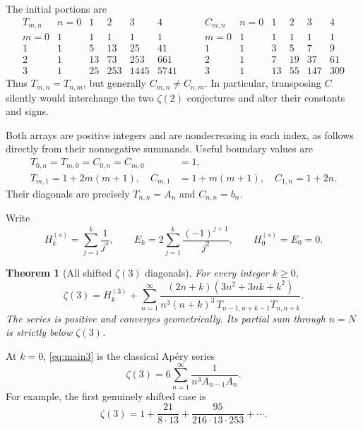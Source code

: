 \documentclass[11pt,letterpaper]{article}
\numberwithin{equation}{section}
\newtheorem{theorem}{Theorem}[section]
\theoremstyle{definition}
\newcommand{\Hh}[2]{H_{#1}^{(#2)}}
\newcommand{\zthree}{\zeta(3)}
\begin{document}
The initial portions are
\[
\begin{array}{c|rrrrr}
T_{m,n}&n=0&1&2&3&4\\\hline
m=0&1&1&1&1&1\\
1&1&5&13&25&41\\
2&1&13&73&253&661\\
3&1&25&253&1445&5741
\end{array}
\qquad
\begin{array}{c|rrrrr}
C_{m,n}&n=0&1&2&3&4\\\hline
m=0&1&1&1&1&1\\
1&1&3&5&7&9\\
2&1&7&19&37&61\\
3&1&13&55&147&309
\end{array}
\]
Thus $T_{m,n}=T_{n,m}$, but generally $C_{m,n}\ne C_{n,m}$.
In particular, transposing $C$ silently would interchange the two
$\zeta(2)$ conjectures and alter their constants and signs.

Both arrays are positive integers and are nondecreasing in each index,
as follows directly from their nonnegative summands. Useful boundary
values are
\begin{align}
 T_{0,n}=T_{m,0}=C_{0,n}=C_{m,0}&=1,\label{eq:boundary}\\
 T_{m,1}=1+2m(m+1),\quad
 C_{m,1}&=1+m(m+1),\quad C_{1,n}=1+2n.\label{eq:firstrow}
\end{align}
Their diagonals are precisely $T_{n,n}=A_n$ and $C_{n,n}=b_n$.

Write
\[
 \Hh{k}{s}=\sum_{j=1}^{k}\frac1{j^s},\qquad
 E_k=2\sum_{j=1}^{k}\frac{(-1)^{j+1}}{j^2},
 \qquad \Hh{0}{s}=E_0=0.
\]

\begin{theorem}[All shifted $\zeta(3)$ diagonals]\label{thm:zeta3}
For every integer $k\geq0$,
\begin{equation}\label{eq:main3}
 \boxed{\displaystyle
 \zthree=\Hh{k}{3}+
 \sum_{n=1}^{\infty}
 \frac{(2n+k)(3n^2+3nk+k^2)}
 {n^3(n+k)^3\,T_{n-1,n+k-1}T_{n,n+k}}.}
\end{equation}
The series is positive and converges geometrically. Its partial sum
through $n=N$ is strictly below $\zthree$.
\end{theorem}

At $k=0$, \eqref{eq:main3} is the classical Ap\'ery series
\begin{equation}\label{eq:classical3}
 \zthree=6\sum_{n=1}^{\infty}\frac1{n^3 A_{n-1}A_n}.
\end{equation}
For example, the first genuinely shifted case is
\[
 \zthree=1+\frac{21}{8\cdot13}
              +\frac{95}{216\cdot13\cdot253}+\cdots.
\]
\end{document}
